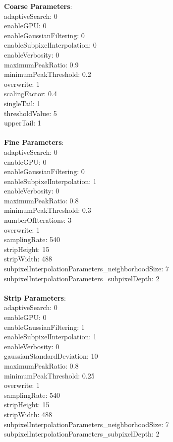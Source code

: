\documentclass[11pt]{article}
\begin{document}
\textbf{Coarse Parameters}: \\
adaptiveSearch: 0\\
enableGPU: 0\\
enableGaussianFiltering: 0\\
enableSubpixelInterpolation: 0\\
enableVerbosity: 0\\
maximumPeakRatio: 0.9\\
minimumPeakThreshold: 0.2\\
overwrite: 1\\
scalingFactor: 0.4\\
singleTail: 1\\
thresholdValue: 5\\
upperTail: 1\\
\\
\textbf{Fine Parameters}: \\
adaptiveSearch: 0\\
enableGPU: 0\\
enableGaussianFiltering: 0\\
enableSubpixelInterpolation: 1\\
enableVerbosity: 0\\
maximumPeakRatio: 0.8\\
minimumPeakThreshold: 0.3\\
numberOfIterations: 3\\
overwrite: 1\\
samplingRate: 540\\
stripHeight: 15\\
stripWidth: 488\\
subpixelInterpolationParameters\_neighborhoodSize: 7\\
subpixelInterpolationParameters\_subpixelDepth: 2\\
\\
\textbf{Strip Parameters}: \\
adaptiveSearch: 0\\
enableGPU: 0\\
enableGaussianFiltering: 1\\
enableSubpixelInterpolation: 1\\
enableVerbosity: 0\\
gaussianStandardDeviation: 10\\
maximumPeakRatio: 0.8\\
minimumPeakThreshold: 0.25\\
overwrite: 1\\
samplingRate: 540\\
stripHeight: 15\\
stripWidth: 488\\
subpixelInterpolationParameters\_neighborhoodSize: 7\\
subpixelInterpolationParameters\_subpixelDepth: 2\\
\\
\newpage
\end{document}
